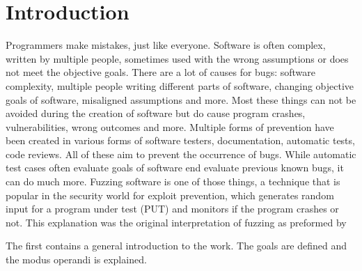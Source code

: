 \chapter{Introduction}
\label{cha:intro}
Programmers make mistakes, just like everyone.
Software is often complex, written by multiple people, sometimes used with the wrong assumptions or does not meet the objective goals. 
There are a lot of causes for bugs: software complexity, multiple people writing different parts of software, changing objective goals of software, misaligned assumptions and more. Most these things can not be avoided during the creation of software but do cause program crashes, vulnerabilities, wrong outcomes and more.
Multiple forms of prevention have been created in various forms of software testers, documentation, automatic tests, code reviews. All of these aim to prevent the occurrence of bugs. While automatic test cases often evaluate goals of software end evaluate previous known bugs, it can do much more.
Fuzzing software is one of those things, a technique that is popular in the security world for exploit prevention, which generates random input for a program under test (PUT) and monitors if the program crashes or not. This explanation was the original interpretation of fuzzing as preformed by \cite{originalFuzzingUnixUtils}


The first contains a general introduction to the work. The goals are defined and the modus operandi is explained.

